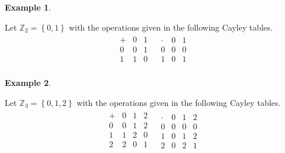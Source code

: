 \documentclass[
]{book}
\theoremstyle{definition}
\theoremstyle{definition}
\newtheorem{example}{Example}[chapter]
\theoremstyle{definition}
\theoremstyle{definition}
\theoremstyle{remark}
\begin{document}
\begin{example}
\protect\hypertarget{exm:z2ring}{}\label{exm:z2ring}

Let \(\mathbb{Z}_2=\left\{ 0,1 \right\}\) with the operations given in the following Cayley tables.
\[\begin{array}{cc}
\begin{array}{c|cc}
+ & 0 & 1 \\ \hline
0 & 0 & 1 \\
1 & 1 & 0 \\
\end{array}
&
\begin{array}{c|cc}
\cdot & 0 & 1 \\ \hline
0 & 0 & 0 \\
1 & 0 & 1 \\
\end{array}
\end{array}\]

\end{example}

\begin{example}
\protect\hypertarget{exm:z3ring}{}\label{exm:z3ring}

Let \(\mathbb{Z}_3=\left\{ 0,1, 2 \right\}\) with the operations given in the following Cayley tables.
\[\begin{array}{cc}
\begin{array}{c|ccc}
+ & 0 & 1 & 2 \\ \hline
0 & 0 & 1 & 2\\
1 & 1 & 2 & 0 \\
2 & 2 & 0 & 1 \\
\end{array} &
\begin{array}{c|ccc}
\cdot & 0 & 1 & 2\\ \hline
0 & 0 & 0  & 0 \\
1 & 0 & 1 & 2 \\
2 & 0 & 2 & 1
\end{array} \\
\end{array}\]

\end{example}
\end{document}
